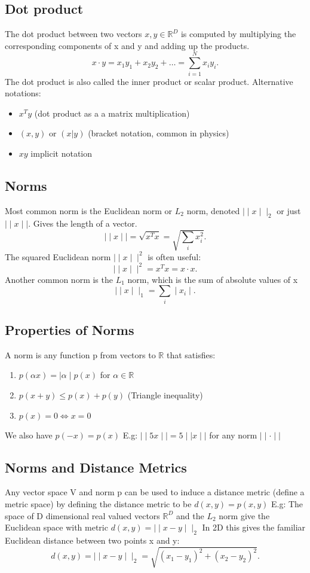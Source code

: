 \documentclass[a4paper]{article}
\newcommand{\R}{\mathbb{R}}
\newcommand{\0}{\mathbb{\emptyset}}
\begin{document}
	\subsection{Dot product}
	The dot product between two vectors $x,y \in \R^D$ is computed by multiplying the
	corresponding components of x and y and adding up the products.
	\[
	x\cdot y = x_1 y_1 + x_2 y_2 + \ldots = \sum_{i=1}^{N} x_i y_i
	.\] 
	The dot product is also called the inner product or scalar product.
	Alternative notations:
	 \begin{itemize}
		 \item $x^T y$ (dot product as a a matrix multiplication)
		 \item $(x,y)$ or $(x|y)$ (bracket notation, common in physics)
		 \item $xy$ implicit notation
	\end{itemize}
	\subsection{Norms}
	Most common norm is the Euclidean norm or $L_2$ norm, denoted $\mid\mid x\mid\mid_2$
	or just $ \mid  \mid x \mid  \mid $.
	Gives the length of a vector.
	\[
	\mid  \mid x \mid  \mid = \sqrt{x^T x} = \sqrt{\sum_{i}x_i^2} 
	.\] 
	The squared Euclidean norm $ \mid  \mid x \mid  \mid^2$ is often useful:
	\[
	 \mid  \mid x \mid  \mid^2 = x^Tx = x\cdot x
	.\] 
	Another common norm is the $L_1$ norm, which is the sum of absolute values of x
	\[
		\mid  \mid x \mid  \mid_1 = \sum_{i} \mid x_i \mid 
	.\] 
	\subsection{Properties of Norms}
	A norm is any function p from vectors to $\R$ that satisfies:
	\begin{enumerate}
		\item $p(\alpha x) =  \mid \alpha  \mid p(x)$ for $\alpha \in \R$ 
		\item $p(x+y) \le p(x) + p(y)$ (Triangle inequality)
		\item $p(x) = 0 \iff x = 0$
	\end{enumerate}
	We also have $p(-x) = p(x)$
	E.g: $ \mid  \mid 5x \mid  \mid = 5  \mid \mid x  \mid \mid$ for any norm $ \mid  \mid \cdot  \mid  \mid $
	\subsection{Norms and Distance Metrics}
	Any vector space V and norm p can be used to induce a distance metric (define a metric
	space) by defining the distance metric to be $d(x,y) = p(x,y)$ 
	E.g: The space of D dimensional real valued vectors $\R^D$ and the $L_2$ norm give the 
	Euclidean space with metric $d(x,y) =  \mid  \mid x - y  \mid  \mid_2$
	In 2D this gives the familiar Euclidean distance between two points x and y:
	\[
		d(x,y) =  \mid  \mid x-y \mid  \mid_2 = \sqrt{(x_1-y_1)^2+(x_2-y_2)^2} 
	.\] 
\end{document}
